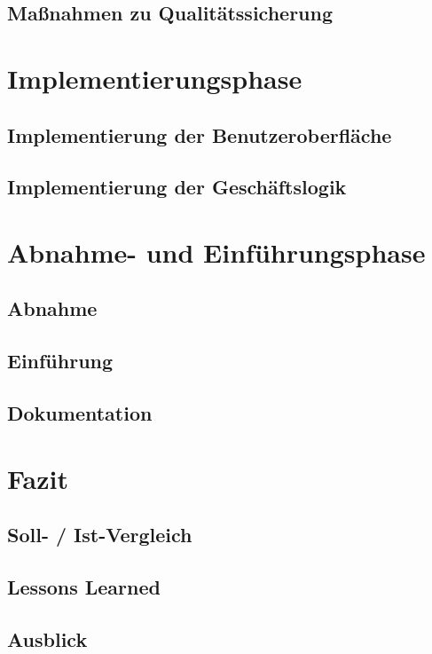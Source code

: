\section{Maßnahmen zu Qualitätssicherung}

\chapter{Implementierungsphase}
\section{Implementierung der Benutzeroberfläche}
\section{Implementierung der Geschäftslogik}

\chapter{Abnahme- und Einführungsphase}

\section{Abnahme}
\section{Einführung}
\section{Dokumentation}

\chapter{Fazit}
\section{Soll- / Ist-Vergleich}
\section{Lessons Learned}
\section{Ausblick}
